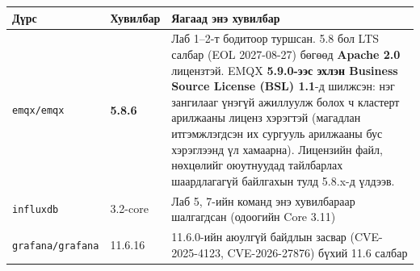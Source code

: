 \begingroup\scriptsize\begin{longtable}[]{@{}lll@{}}
\toprule
\begin{minipage}[b]{0.30\columnwidth}\raggedright
Дүрс\strut
\end{minipage} & \begin{minipage}[b]{0.30\columnwidth}\raggedright
Хувилбар\strut
\end{minipage} & \begin{minipage}[b]{0.30\columnwidth}\raggedright
Яагаад энэ хувилбар\strut
\end{minipage}\tabularnewline
\midrule
\endhead
\begin{minipage}[t]{0.30\columnwidth}\raggedright
\texttt{emqx/emqx}\strut
\end{minipage} & \begin{minipage}[t]{0.30\columnwidth}\raggedright
\textbf{5.8.6}\strut
\end{minipage} & \begin{minipage}[t]{0.30\columnwidth}\raggedright
Лаб 1--2-т бодитоор туршсан. 5.8 бол LTS салбар (EOL 2027-08-27) бөгөөд \textbf{Apache 2.0} лицензтэй. EMQX \textbf{5.9.0-ээс эхлэн Business Source License (BSL) 1.1}-д шилжсэн: нэг зангилааг үнэгүй ажиллуулж болох ч кластерт арилжааны лиценз хэрэгтэй (магадлан итгэмжлэгдсэн их сургууль арилжааны бус хэрэглээнд үл хамаарна). Лицензийн файл, нөхцөлийг оюутнуудад тайлбарлах шаардлагагүй байлгахын тулд 5.8.x-д үлдээв.\strut
\end{minipage}\tabularnewline
\begin{minipage}[t]{0.30\columnwidth}\raggedright
\texttt{influxdb}\strut
\end{minipage} & \begin{minipage}[t]{0.30\columnwidth}\raggedright
3.2-core\strut
\end{minipage} & \begin{minipage}[t]{0.30\columnwidth}\raggedright
Лаб 5, 7-ийн команд энэ хувилбараар шалгагдсан (одоогийн Core 3.11)\strut
\end{minipage}\tabularnewline
\begin{minipage}[t]{0.30\columnwidth}\raggedright
\texttt{grafana/grafana}\strut
\end{minipage} & \begin{minipage}[t]{0.30\columnwidth}\raggedright
11.6.16\strut
\end{minipage} & \begin{minipage}[t]{0.30\columnwidth}\raggedright
11.6.0-ийн аюулгүй байдлын засвар (CVE-2025-4123, CVE-2026-27876) бүхий 11.6 салбар\strut

\end{minipage}
\end{longtable}
